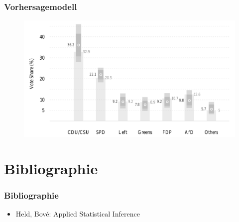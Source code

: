 \documentclass[aspectratio=169,xcolor=dvipsnames]{beamer}
\begin{document}
\begin{frame}
	\frametitle{Vorhersagemodell}
	\begin{figure}
		\includegraphics[height=0.85\textheight]{forecast}
	\end{figure}
\end{frame}

\section{Bibliographie}
\begin{frame}
\frametitle{Bibliographie}
\begin{itemize}
	\item Held, Bov\'{e}: Applied Statistical Inference
\end{itemize}
\end{frame}
\end{document}

